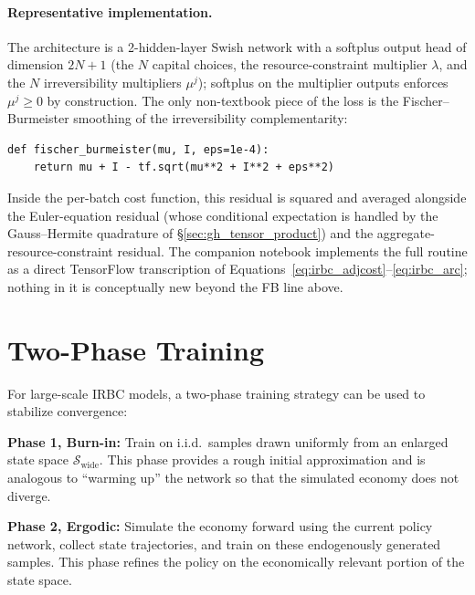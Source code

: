 \documentclass[11pt,a4paper]{report}
\begin{document}
\paragraph{Representative implementation.}  The architecture is a 2-hidden-layer Swish network with a softplus output head of dimension $2N + 1$ (the $N$ capital choices, the resource-constraint multiplier $\lambda$, and the $N$ irreversibility multipliers $\mu^j$); softplus on the multiplier outputs enforces $\mu^j \ge 0$ by construction.  The only non-textbook piece of the loss is the Fischer--Burmeister smoothing of the irreversibility complementarity:
\begin{lstlisting}[caption={Fischer--Burmeister smoothing of $\mu \perp I$ (the only non-trivial line of the IRBC loss).}, label=lst:irbc_fb]
def fischer_burmeister(mu, I, eps=1e-4):
    return mu + I - tf.sqrt(mu**2 + I**2 + eps**2)
\end{lstlisting}
Inside the per-batch cost function, this residual is squared and averaged alongside the Euler-equation residual (whose conditional expectation is handled by the Gauss--Hermite quadrature of \S\ref{sec:gh_tensor_product}) and the aggregate-resource-constraint residual.  The companion notebook  implements the full  routine as a direct TensorFlow transcription of Equations~\eqref{eq:irbc_adjcost}--\eqref{eq:irbc_arc}; nothing in it is conceptually new beyond the FB line above.

\section{Two-Phase Training}

For large-scale IRBC models, a two-phase training strategy can be used to stabilize convergence:

\begin{definitionbox}
\textbf{Phase 1, Burn-in:} Train on i.i.d.\ samples drawn uniformly from an enlarged state space $\mathcal{S}_\mathrm{wide}$.  This phase provides a rough initial approximation and is analogous to ``warming up'' the network so that the simulated economy does not diverge.

\smallskip
\textbf{Phase 2, Ergodic:} Simulate the economy forward using the current policy network, collect state trajectories, and train on these endogenously generated samples.  This phase refines the policy on the economically relevant portion of the state space.
\end{definitionbox}
\end{document}
